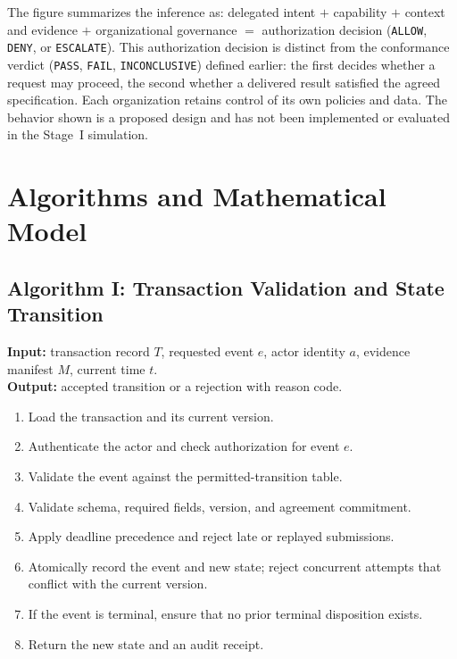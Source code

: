 \documentclass[12pt,a4paper,oneside]{report}
\begin{document}
The figure summarizes the inference as: delegated intent $+$ capability $+$ context and evidence $+$ organizational governance $=$ authorization decision (\texttt{ALLOW}, \texttt{DENY}, or \texttt{ESCALATE}). This authorization decision is distinct from the conformance verdict (\texttt{PASS}, \texttt{FAIL}, \texttt{INCONCLUSIVE}) defined earlier: the first decides whether a request may proceed, the second whether a delivered result satisfied the agreed specification. Each organization retains control of its own policies and data. The behavior shown is a proposed design and has not been implemented or evaluated in the Stage~I simulation.

\chapter{Algorithms and Mathematical Model}
\section{Algorithm I: Transaction Validation and State Transition}
\textbf{Input:} transaction record $T$, requested event $e$, actor identity $a$, evidence manifest $M$, current time $t$.\\
\textbf{Output:} accepted transition or a rejection with reason code.
\begin{enumerate}[leftmargin=*]
\item Load the transaction and its current version.
\item Authenticate the actor and check authorization for event $e$.
\item Validate the event against the permitted-transition table.
\item Validate schema, required fields, version, and agreement commitment.
\item Apply deadline precedence and reject late or replayed submissions.
\item Atomically record the event and new state; reject concurrent attempts that conflict with the current version.
\item If the event is terminal, ensure that no prior terminal disposition exists.
\item Return the new state and an audit receipt.
\end{enumerate}
\end{document}
